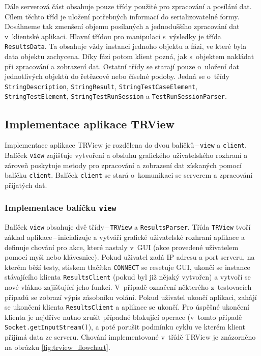 	Dále serverová část obsahuje pouze třídy použité pro zpracování a posílání dat. Cílem těchto tříd je uložení potřebných informací do serializovatelné formy. Dosáhneme tak zmenšení objemu posílaných a jednoduššího zpracování dat v~klientské aplikaci. Hlavní třídou pro manipulaci s~výsledky je třída \texttt{ResultsData}. Ta obsahuje vždy instanci jednoho objektu a fázi, ve které byla data objektu zachycena. Díky fázi potom klient pozná, jak s~objektem nakládat při zpracování a zobrazení dat. Ostatní třídy se starají pouze o~uložení dat jednotlivých objektů do řetězcové nebo číselné podoby. Jedná se o~třídy \texttt{StringDescription}, \texttt{StringResult}, \texttt{StringTestCaseElement}, \texttt{StringTestElement}, \texttt{StringTestRunSession} a \texttt{TestRunSessionParser}.

    \subsection{Implementace aplikace TRView}
    Implementace aplikace TRView je rozdělena do dvou balíčků\,--\,\texttt{view} a \texttt{client}. Balíček \texttt{view} zajišťuje vytvoření a obsluhu grafického uživatelského rozhraní a zároveň poskytuje metody pro zpracování a zobrazení dat získaných pomocí balíčku \texttt{client}. Balíček \texttt{client} se stará o~komunikaci se serverem a zpracování přijatých dat.

      \subsubsection{Implementace balíčku \texttt{view}}
      Balíček \texttt{view} obsahuje dvě třídy\,--\,\texttt{TRView} a \texttt{ResultsParser}. Třída \texttt{TRView} tvoří základ aplikace\,--\,inicializuje a vytváří grafické uživatelské rozhraní aplikace a definuje chování pro akce, které nastaly v~GUI (akce provedené uživatelem pomocí myši nebo klávesnice). Pokud uživatel zadá IP adresu a port serveru, na kterém běží testy, stiskem tlačítka \texttt{CONNECT} se resetuje GUI, ukončí se instance stávajícího klienta \texttt{ResultsClient} (pokud byl již nějaký vytvořen) a vytvoří se nové vlákno zajišťující jeho funkci. V~případě označení některého z~testovacích případů se zobrazí výpis zásobníku volání. Pokud uživatel ukončí aplikaci, zahájí se ukončení klienta \texttt{ResultsClient} a aplikace se ukončí. Pro úspěšné ukončení klienta je nejdříve nutno zrušit případné blokující operace (v~tomto případě \texttt{Socket.getInputStream()}), a poté porušit podmínku cyklu ve kterém klient přijímá data ze serveru. Chování implementované v~třídě TRView je znázorněno na obrázku \ref{fig:trview_flowchart}.


